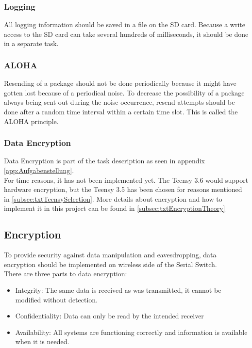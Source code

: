 \subsubsection{Logging}
All logging information should be saved in a file on the SD card. Because a write access to the SD card can take several hundreds of milliseconds, it should be done in a separate task.
%
\subsubsection{ALOHA}
Resending of a package should not be done periodically because it might have gotten lost because of a periodical noise. To decrease the possibility of a package always being sent out during the noise occurrence, resend attempts should be done after a random time interval within a certain time slot. This is called the ALOHA principle.
%
%
\subsubsection{Data Encryption}
Data Encryption is part of the task description as seen in appendix \autoref{app:Aufgabenstellung}.\\
For time reasons, it has not been implemented yet. The Teensy 3.6 would support hardware encryption, but the Teensy 3.5 has been chosen for reasons mentioned in \autoref{subsec:txtTeensySelection}. More details about encryption and how to implement it in this project can be found in \autoref{subsec:txtEncryptionTheory}
%
%
%
%
\subsection{Encryption} \label{subsec:txtEncryptionTheory}
To provide security against data manipulation and eavesdropping, data encryption should be implemented on wireless side of the Serial Switch.\\
There are three parts to data encryption:
\begin{itemize}
    \item Integrity: The same data is received as was transmitted, it cannot be modified without detection.
    \item Confidentiality: Data can only be read by the intended receiver
    \item Availability: All systems are functioning correctly and information is available when it is needed.
\end{itemize}
%
